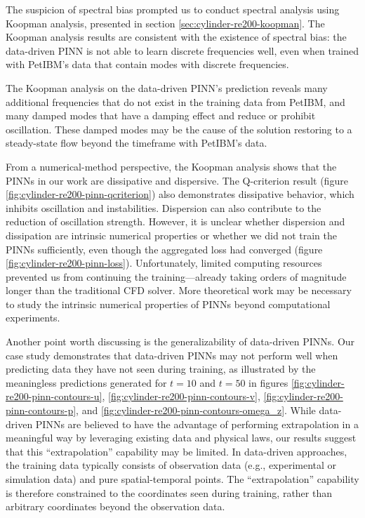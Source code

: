 The suspicion of spectral bias prompted us to conduct spectral analysis using Koopman analysis, presented in section \ref{sec:cylinder-re200-koopman}.
The Koopman analysis results are consistent with the existence of spectral bias: the data-driven PINN is not able to learn discrete frequencies well, even when trained with PetIBM's data that contain modes with discrete frequencies.

The Koopman analysis on the data-driven PINN's prediction reveals many additional frequencies that do not exist in the training data from PetIBM, and many damped modes that have a damping effect and reduce or prohibit oscillation.
These damped modes may be the cause of the solution restoring to a steady-state flow beyond the timeframe with PetIBM's data.

From a numerical-method perspective, the Koopman analysis shows that the PINNs in our work are dissipative and dispersive.
The Q-criterion result (figure \ref{fig:cylinder-re200-pinn-qcriterion}) also demonstrates dissipative behavior, which inhibits oscillation and instabilities.
Dispersion can also contribute to the reduction of oscillation strength.
However, it is unclear whether dispersion and dissipation are intrinsic numerical properties or whether we did not train the PINNs sufficiently, even though the aggregated loss had converged (figure \ref{fig:cylinder-re200-pinn-loss}).
Unfortunately, limited computing resources prevented us from continuing the training---already taking orders of magnitude longer than the traditional CFD solver.
More theoretical work may be necessary to study the intrinsic numerical properties of PINNs beyond computational experiments.

Another point worth discussing is the generalizability of data-driven PINNs.
Our case study demonstrates that data-driven PINNs may not perform well when predicting data they have not seen during training, as illustrated by the meaningless predictions generated for $t = 10$ and $t = 50$ in figures \ref{fig:cylinder-re200-pinn-contours-u}, \ref{fig:cylinder-re200-pinn-contours-v}, \ref{fig:cylinder-re200-pinn-contours-p}, and \ref{fig:cylinder-re200-pinn-contours-omega_z}.
While data-driven PINNs are believed to have the advantage of performing extrapolation in a meaningful way by leveraging existing data and physical laws, our results suggest that this ``extrapolation'' capability may be limited.
In data-driven approaches, the training data typically consists of observation data (e.g., experimental or simulation data) and pure spatial-temporal points.
The ``extrapolation'' capability is therefore constrained to the coordinates seen during training, rather than arbitrary coordinates beyond the observation data.

